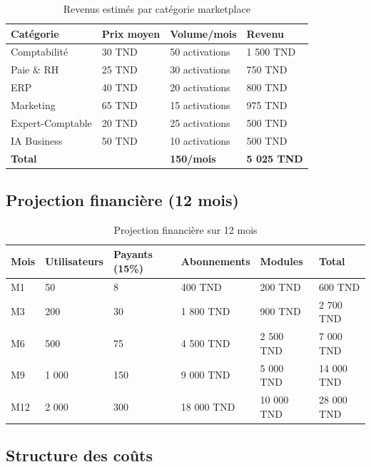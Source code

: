 \begin{table}[H]
\centering
\caption{Revenus estimés par catégorie marketplace}
\label{tab:marketplace-revenue}
\begin{tabular}{|l|l|l|l|}
\hline
\textbf{Catégorie} & \textbf{Prix moyen} & \textbf{Volume/mois} & \textbf{Revenu} \\
\hline
Comptabilité & 30 TND & 50 activations & 1 500 TND \\
\hline
Paie \& RH & 25 TND & 30 activations & 750 TND \\
\hline
ERP & 40 TND & 20 activations & 800 TND \\
\hline
Marketing & 65 TND & 15 activations & 975 TND \\
\hline
Expert-Comptable & 20 TND & 25 activations & 500 TND \\
\hline
IA Business & 50 TND & 10 activations & 500 TND \\
\hline
\textbf{Total} & & \textbf{150/mois} & \textbf{5 025 TND} \\
\hline
\end{tabular}
\end{table}

\subsection{Projection financière (12 mois)}

\begin{table}[H]
\centering
\caption{Projection financière sur 12 mois}
\label{tab:financial-projection}
\begin{tabular}{|l|l|l|l|l|l|}
\hline
\textbf{Mois} & \textbf{Utilisateurs} & \textbf{Payants (15\%)} & \textbf{Abonnements} & \textbf{Modules} & \textbf{Total} \\
\hline
M1 & 50 & 8 & 400 TND & 200 TND & 600 TND \\
\hline
M3 & 200 & 30 & 1 800 TND & 900 TND & 2 700 TND \\
\hline
M6 & 500 & 75 & 4 500 TND & 2 500 TND & 7 000 TND \\
\hline
M9 & 1 000 & 150 & 9 000 TND & 5 000 TND & 14 000 TND \\
\hline
M12 & 2 000 & 300 & 18 000 TND & 10 000 TND & 28 000 TND \\
\hline
\end{tabular}
\end{table}

\subsection{Structure des coûts}

